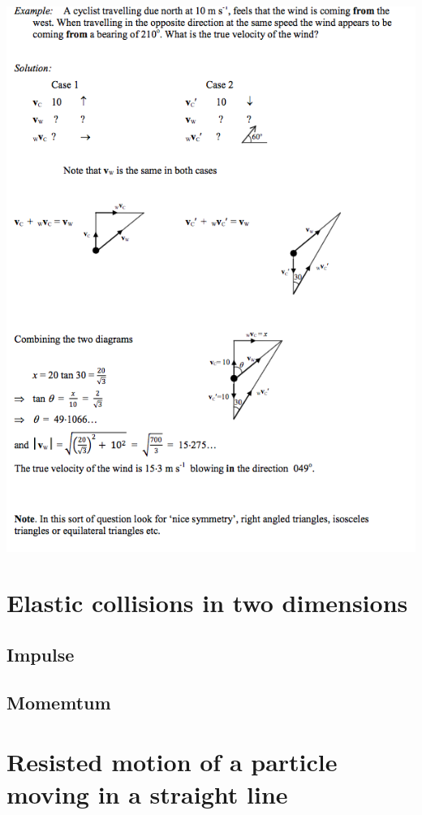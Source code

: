 \documentclass[a4paper]{article}
\begin{document}
\begin{center}
    \includegraphics[scale=0.5]{img_M/15_eg4}
\end{center}

\section{Elastic collisions in two dimensions}
\subsection{Impulse}
\subsection{Momemtum}

\section{Resisted motion of a particle moving in a straight line}
\end{document}
